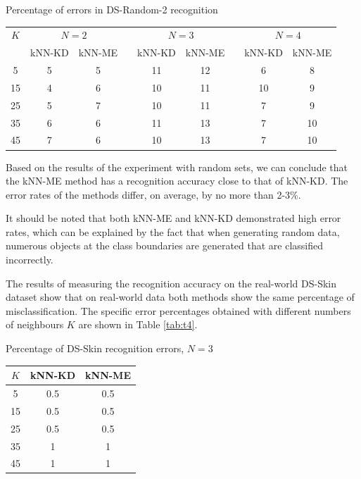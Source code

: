 \documentclass[entropy,article,submit,moreauthors,pdftex]{Definitions/mdpi}
\begin{document}
\begin{paracol}{2}
\begin{specialtable}[H] 
  \caption{Percentage of errors in DS-Random-2 recognition}\label{tab:t3}
	\center
	\begin{tabular}{ccccccccc}
\toprule
$K$ & \multicolumn{2}{c}{ $N=2$ } & & \multicolumn{2}{c}{$N=3$} & & \multicolumn{2}{c}{$N=4$} \\
		\noalign{\smallskip} \cline{2-3} \cline{5-6} \cline{8-9} \noalign{\smallskip}
  & kNN-KD & kNN-ME & & kNN-KD & kNN-ME & & kNN-KD & kNN-ME \\
\midrule													
5  & 5 & 5 & & 11 & 12 & & 6 & 8 \\
15 & 4 & 6 & & 10 & 11 & & 10 & 9 \\
25 & 5 & 7 & & 10 & 11 & & 7 & 9 \\
35 & 6 & 6 & & 11 & 13 & & 7 & 10 \\
45 & 7 & 6 & & 10 & 13 & & 7 & 10 \\
\bottomrule
\end{tabular}
\end{specialtable}

Based on the results of the experiment with random sets, we can conclude that the kNN-ME method has a recognition accuracy close to that of kNN-KD. The error rates of the methods differ, on average, by no more than 2-3\%.

It should be noted that both kNN-ME and kNN-KD demonstrated high error rates, which can be explained by the fact that when generating random data, numerous objects at the class boundaries are generated that are classified incorrectly.

The results of measuring the recognition accuracy on the real-world DS-Skin dataset show that on real-world data both methods show the same percentage of misclassification. The specific error percentages obtained with different numbers of neighbours $K$ are shown in Table \ref{tab:t4}.

\begin{specialtable}[H] 
  \caption{Percentage of DS-Skin recognition errors, $N=3$}\label{tab:t4}
	\center
\begin{tabular}{ccc}
\toprule
$K$ & kNN-KD & kNN-ME \\
\midrule													
5 & 0.5 & 0.5 \\
15 & 0.5 & 0.5 \\
25 & 0.5 & 0.5\\
35 & 1 & 1\\
45 & 1 & 1\\
\bottomrule
\end{tabular}
\end{specialtable}


\end{paracol}
\end{document}
